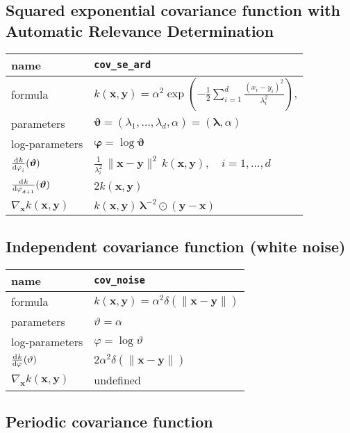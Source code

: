 \documentclass{article}
\newcommand{\NL}{\\ \midrule} %
\newcommand{\bx}{\bm{x}}
\newcommand{\by}{\bm{y}}
\newcommand{\btheta}{\bm{\vartheta}}
\newcommand{\bphi}{\bm{\varphi}}
\begin{document}
\subsection{Squared exponential covariance function with Automatic Relevance Determination}

\begin{tabularx}{\textwidth}{@{} X X @{}}
%
name & \verb|cov_se_ard|  \NL
 formula &  $ k(\bx,\by) = \displaystyle \alpha^2 \exp\left( -\frac{1}{2} \sum_{i=1}^d  \frac{(x_i-y_i)^2}{\lambda_i^2} \right) $,  \NL
% 
parameters & $ \btheta = (\lambda_1,\ldots,\lambda_d,\alpha) =  (\bm\lambda,\alpha)  $\NL
% 
log-parameters & $ \bphi = \log \btheta$ \NL
%
$\displaystyle \od{k}{\varphi_i}(\btheta) $ & $\displaystyle \frac{1}{\lambda_{i}^2}  \, \|\bx-\by\|^2 \, k(\bx,\by) , \quad i=1,\ldots,d$ \NL
$\displaystyle \od{k}{\varphi_{d+1}}(\btheta)$ & $2k(\bx,\by)$ \NL
%
$\displaystyle \nabla_{\bx} k(\bx, \by)$ & $  \displaystyle    k(\bx,\by) \,  \bm\lambda^{-2} \odot (\by-\bx)  $ \NL 
%
\end{tabularx}








\subsection{Independent covariance function (white noise)}

\begin{tabularx}{\textwidth}{@{} X X @{}}
%
 name & \verb|cov_noise|  \NL
 formula &  $k(\bx,\by) = \alpha^2 \delta(\|\bm{x}-\bm{y}\|) $  \NL
% 
parameters & $\vartheta = \alpha$  \NL
% 
log-parameters & $\varphi = \log \vartheta $ \NL
%
$\displaystyle \od{k}{\varphi}(\vartheta)$ & $2\alpha^2 \delta(\|\bm{x}-\bm{y}\|)$ \NL
%
$\displaystyle \nabla_{\bx} k(\bx, \by)$ & undefined \NL 
%
\end{tabularx}






\subsection{Periodic covariance function}
\end{document}
